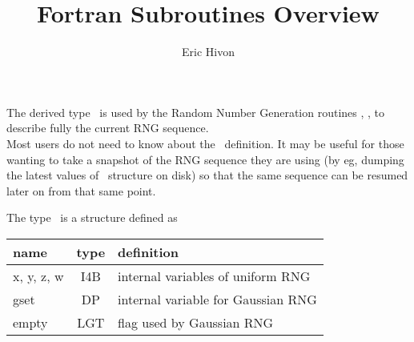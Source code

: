
\sloppy


\title{\healpix Fortran Subroutines Overview}
 \section[planck\_rng derived type]{ }
\label{sub:planck_rng}
\author{Eric Hivon}

\begin{facility}
{The derived type \thedocid\ is used by the Random Number Generation routines 
,
, 
 to describe fully the current RNG
sequence.\\
Most users do not need to know about the \thedocid\ definition. It may be
useful for those wanting to take a snapshot of the RNG sequence they are using (by eg,
dumping the latest values of \thedocid\ structure on disk) so that the same sequence can be resumed
later on from that same point.}
{\modRngmod}
\end{facility}



The type \thedocid\ is a structure defined as

\begin{mytable}{%
\begin{tabularx}{\linewidth}{lc X}
name & type  & definition \\
\hline
x, y, z, w & I4B & internal variables of uniform RNG\\
gset & DP & internal variable for Gaussian RNG\\
empty & LGT & flag used by Gaussian RNG\\
\hline
\end{tabularx}
}%
\end{mytable}





